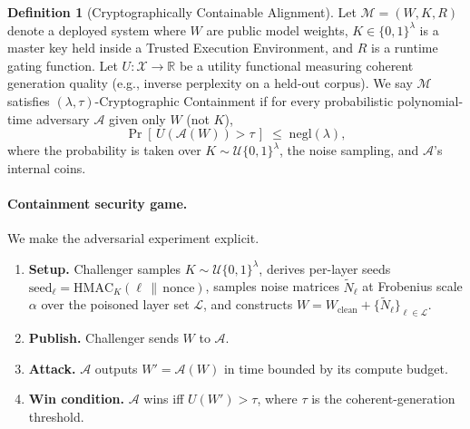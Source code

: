 \documentclass[10pt,letterpaper]{article}
\theoremstyle{definition}
\newtheorem{definition}{Definition}
\theoremstyle{plain}
\begin{document}
\begin{definition}[Cryptographically Containable Alignment]
\label{def:cca}
Let $\mathcal{M} = (W, K, R)$ denote a deployed system where $W$ are
public model weights, $K \in \{0,1\}^\lambda$ is a master key held
inside a Trusted Execution Environment, and $R$ is a runtime gating
function. Let $U: \mathcal{X} \to \mathbb{R}$ be a utility functional
measuring coherent generation quality (e.g., inverse perplexity on a
held-out corpus). We say $\mathcal{M}$ satisfies
$(\lambda, \tau)$-Cryptographic Containment if for every probabilistic
polynomial-time adversary $\mathcal{A}$ given only $W$ (not $K$),
\begin{equation}
\Pr\!\left[\, U\!\left(\mathcal{A}(W)\right) > \tau \,\right]
\;\leq\; \mathrm{negl}(\lambda),
\end{equation}
where the probability is taken over $K \sim \mathcal{U}\{0,1\}^\lambda$,
the noise sampling, and $\mathcal{A}$'s internal coins.
\end{definition}

\paragraph{Containment security game.} We make the adversarial
experiment explicit.
\begin{enumerate}[leftmargin=2em,itemsep=0pt,topsep=2pt]
\item \textbf{Setup.} Challenger samples
$K \sim \mathcal{U}\{0,1\}^\lambda$, derives per-layer seeds
$\text{seed}_\ell = \text{HMAC}_K(\ell \,\|\, \text{nonce})$, samples
noise matrices $\widetilde{N}_\ell$ at Frobenius scale $\alpha$ over
the poisoned layer set $\mathcal{L}$, and constructs
$W = W_\text{clean} + \{\widetilde{N}_\ell\}_{\ell \in \mathcal{L}}$.
\item \textbf{Publish.} Challenger sends $W$ to $\mathcal{A}$.
\item \textbf{Attack.} $\mathcal{A}$ outputs
$W' = \mathcal{A}(W)$ in time bounded by its compute budget.
\item \textbf{Win condition.} $\mathcal{A}$ wins iff $U(W') > \tau$,
where $\tau$ is the coherent-generation threshold.
\end{enumerate}
\end{document}
